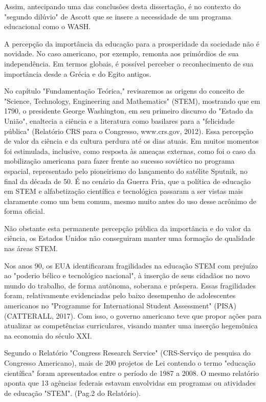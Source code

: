 Assim, antecipando  uma das conclusões desta dissertação, é no contexto do "segundo dilúvio" de Ascott que se insere a necessidade de um programa educacional como o WASH.

A percepção da importância da educação para a prosperidade da sociedade não é novidade. No caso americano, por exemplo, remonta aos primórdios de sua independência. Em termos globais, é possível perceber o reconhecimento de sua importância desde a Grécia e do Egito antigos.

No capítulo "Fundamentação Teórica," revisaremos as origens do conceito de "Science, Technology, Engineering and Mathematics" (STEM), mostrando que em 1790, o presidente George Washington, em seu primeiro discurso do "Estado da União", enaltecia a ciência e a literatura como  basilares para a "felicidade pública" (Relatório CRS para o Congresso, www.crs.gov, 2012). Essa percepção de valor da ciência e da cultura perdura até os dias atuais. Em muitos momentos foi estimulada, inclusive, como resposta às ameaças externas, como foi o caso da mobilização americana para fazer frente ao sucesso soviético no programa espacial, representado pelo pioneirismo do lançamento do satélite Sputnik, no final da década de 50. É no cenário da Guerra Fria, que a política de educação em STEM e alfabetização científica e tecnológica passaram a ser vistas mais claramente como um bem comum, mesmo muito antes do uso desse acrônimo de forma oficial.

Não obstante esta permanente percepção pública da importância e do valor da ciência, os Estados Unidos não conseguiram manter uma formação de qualidade nas áreas STEM.

Nos anos 90, os EUA identificaram fragilidades na educação STEM com prejuízo ao "poderio bélico e tecnológico nacional", à inserção de seus cidadãos no novo mundo do trabalho, de forma autônoma, soberana  e próspera. Essas fragilidades foram, relativamente evidenciadas pelo baixo desempenho de adolescentes americanos no "Programme for International Student Assessment" (PISA)  (CATTERALL, 2017). Com isso, o governo americano teve que propor ações para atualizar as competências curriculares, visando manter uma inserção hegemônica na economia do século XXI.

Segundo o Relatório "Congress Research Service" (CRS-Serviço de pesquisa do Congresso Americano), mais de 200 projetos de Lei contendo o termo "educação científica" foram apresentados entre o período de 1987 a 2008. O mesmo relatório aponta que 13 agências federais estavam envolvidas em programas ou atividades de educação "STEM". (Pag.2 do Relatório).


